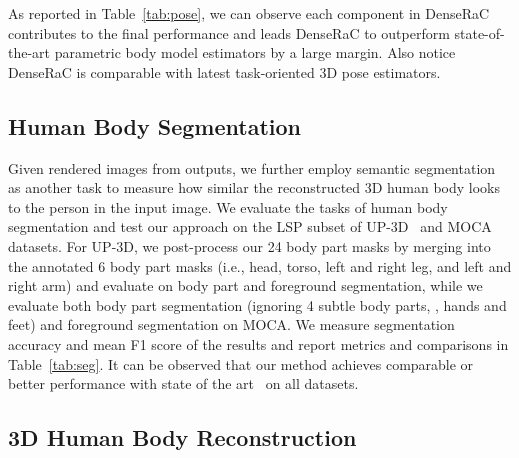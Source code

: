 \documentclass[10pt,twocolumn,letterpaper]{article}
\newcommand{\beforesubsection}{\vspace{0mm}}
\newcommand{\aftersubsection}{\vspace{0mm}}
\begin{document}
As reported in Table~\ref{tab:pose}, we can observe each component in DenseRaC contributes to the final performance
and leads DenseRaC to outperform state-of-the-art parametric body model estimators by a large margin.
Also notice DenseRaC is comparable with latest task-oriented 3D pose estimators.

\beforesubsection
\subsection{Human Body Segmentation}
\aftersubsection

Given rendered images from outputs, we further employ semantic segmentation as another task to measure how similar the reconstructed 3D human body looks to the person in the input image. We evaluate the tasks of human body segmentation and test our approach on the LSP subset of
UP-3D~\cite{lassner2017unite} and MOCA datasets. For UP-3D, we post-process our 24 body part masks by merging into the annotated 6 body part masks (i.e., head, torso, left and right leg, and left and right arm) and evaluate on body part and foreground segmentation, while we evaluate both body part segmentation (ignoring 4 subtle body parts, \ie, hands and feet) and foreground segmentation on MOCA. We measure segmentation accuracy and mean F1 score of the results and report metrics and comparisons in Table~\ref{tab:seg}.
It can be observed that our method achieves comparable or better performance with state of the art~\cite{bogo2016keep,lassner2017unite,kanazawa2018hmr,varol18_bodynet} on all datasets.

\beforesubsection
\subsection{3D Human Body Reconstruction}
\aftersubsection
\end{document}
